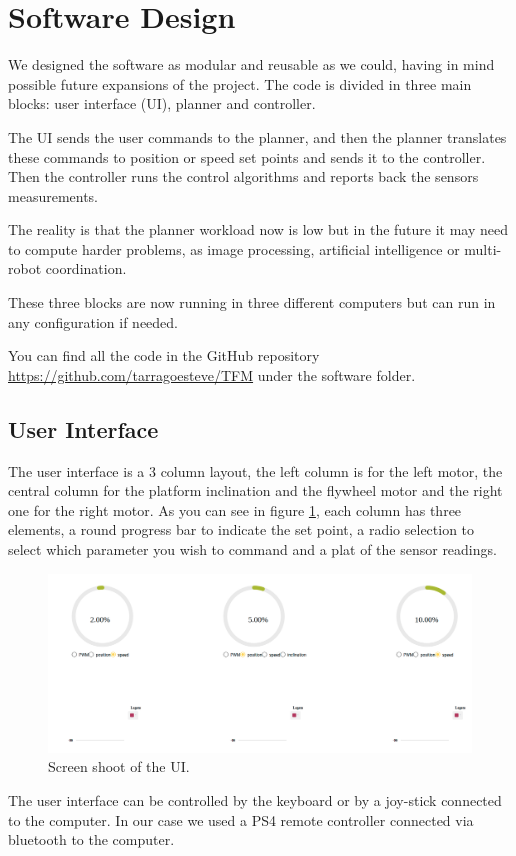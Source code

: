 \section{Software Design}
We designed the software as modular and reusable as we could, having in mind
possible future expansions of the project.
The code is divided in three main blocks: user interface (UI), planner and controller.

The UI sends the user commands to the planner, and then the planner translates these commands to
position or speed set points and sends it to the controller. Then the controller runs the control algorithms
and reports back the sensors measurements.

The reality is that the planner workload now is low but in the future it may need to compute harder problems,
as image processing, artificial intelligence or multi-robot coordination.

These three blocks are now running in three different computers but can run in any configuration if needed.

You can find all the code in the GitHub repository \url{https://github.com/tarragoesteve/TFM} under the 
software folder.

\subsection{User Interface}
The user interface is a 3 column layout, the left column is for the left motor, the central column for the platform inclination and the flywheel motor
and the right one for the right motor. As you can see in figure \ref{fig: UI}, each column has three elements,
a round progress bar to indicate the set point, a radio selection to select which parameter you wish to command and a plat
of the sensor readings.
\begin{figure}[H]
    \centering
    \includegraphics[width=12cm]{img/components/ui.png}
    \caption{Screen shoot of the UI.}
    \label{fig: UI}
\end{figure}
The user interface can be controlled by the keyboard or by a joy-stick connected to the computer. In our case
we used a PS4 remote controller connected via bluetooth to the computer.

